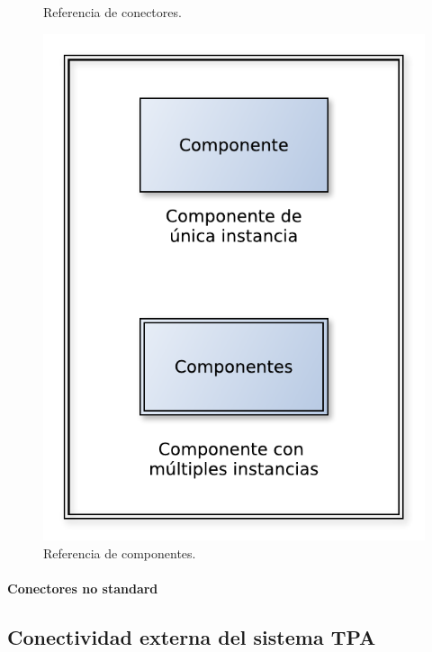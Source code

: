 \begin{multicols}{2}
\begin{figure}[H]
	\caption{Referencia de conectores.}
\end{figure}
\begin{figure}[H]
  \centering
  \includegraphics[scale=0.6]{graficos/comp_reference.pdf}
  \caption{Referencia de componentes.}
\end{figure}
\end{multicols}

\paragraph{Conectores no standard}

\begin{itemize}
\end{itemize}

\subsection{Conectividad externa del sistema \textbf{TPA}}

